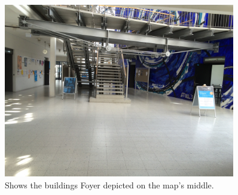 \begin{figure}
	\includegraphics[width=0.9\textwidth]{figures/F-Foyer}
	\caption{Shows the buildings Foyer depicted on the map's middle.}
	\label{fig:f-foyer}
\end{figure}

